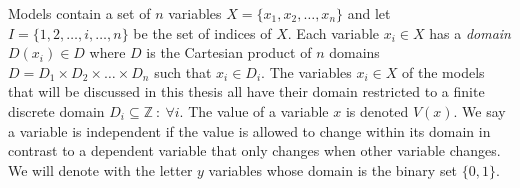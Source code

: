 Models contain a set of $n$ variables $X = \{ x_1, x_2, \dots , x_n \} $ and let $I = \{1,2,\dots, i, \dots , n\}$ be 
the set of indices of $X$. Each variable $x_i \in X$ has a \emph{domain} $D(x_i) \in D$ where $D$ is the Cartesian 
product of $n$ domains $D =  D_1 \times D_2 \times \dots\times D_n $ such that $x_i \in D_i$. The variables $x_i \in X$ 
of the models that will be discussed in this thesis all have their domain restricted to a finite discrete domain $D_i 
\subseteq \mathbb{Z}\ : \: \forall i$.  The value of a variable $x$ is denoted $V(x)$. We say a variable is 
independent if the value is allowed to change within its domain in contrast to a dependent variable that only changes 
when other variable changes. We will denote with the letter $y$ variables whose domain is the binary set $\{0,1\}$. 